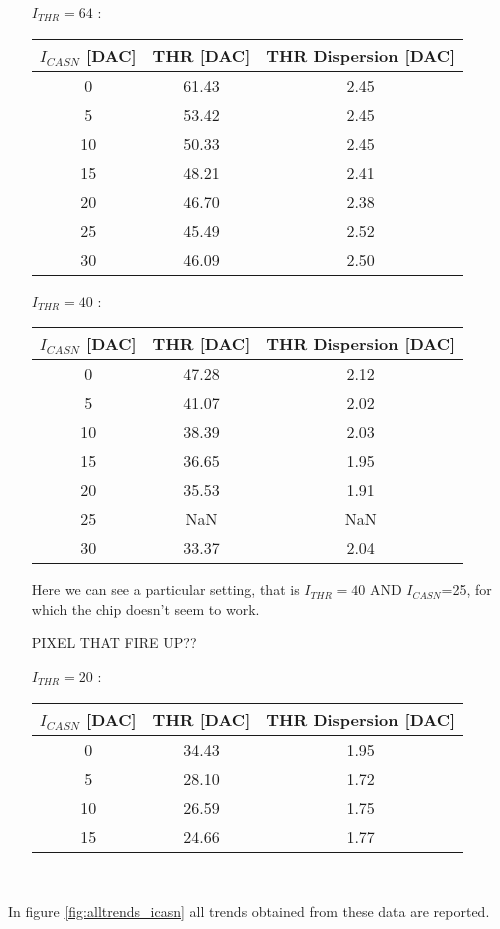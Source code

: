 \begin{itemize}
\item[$I_{THR}=64$]:

\begin{tabular}{c | c | c}
$I_{CASN}$ [DAC] & THR [DAC] & THR Dispersion [DAC]\\
\hline
0 & 61.43 & 2.45\\
5 & 53.42 & 2.45\\
10 & 50.33 & 2.45\\
15 & 48.21 & 2.41\\
20 & 46.70 & 2.38\\
25 & 45.49 & 2.52\\
30 & 46.09 & 2.50
\end{tabular}

\item[$I_{THR}=40$]:

\begin{tabular}{c | c | c}
$I_{CASN}$ [DAC] & THR [DAC] & THR Dispersion [DAC]\\
\hline
0 & 47.28 & 2.12\\
5 & 41.07 & 2.02\\
10 & 38.39 & 2.03\\
15 & 36.65 & 1.95\\
20 & 35.53 & 1.91\\
25 & NaN & NaN\\
30 & 33.37 & 2.04
\end{tabular}

Here we can see a particular setting, that is $I_{THR}=40$ AND $I_{CASN}$=25, for which the chip doesn't seem to work.

PIXEL THAT FIRE UP??

\item[$I_{THR}=20$]:

\begin{tabular}{c | c | c}
$I_{CASN}$ [DAC] & THR [DAC] & THR Dispersion [DAC]\\
\hline
0 & 34.43 & 1.95\\
5 & 28.10& 1.72\\
10 & 26.59 & 1.75\\
15 & 24.66 & 1.77\\
\end{tabular}
\medskip\\

\end{itemize}

In figure \vref{fig:alltrends_icasn} all trends obtained from these data are reported.

